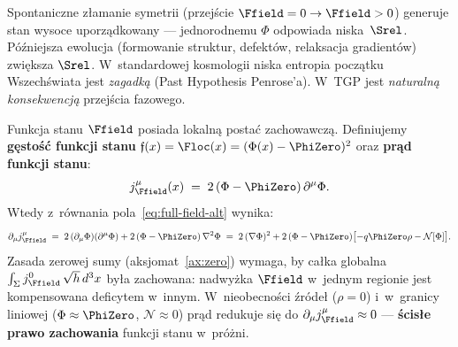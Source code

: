 \begin{remark}
Spontaniczne z\l{}amanie symetrii (przej\'scie
$\Ffield = 0 \to \Ffield > 0$) generuje stan wysoce
uporz\k{a}dkowany --- jednorodnemu $\Phi$ odpowiada
niska~$\Srel$. P\'o\'zniejsza ewolucja (formowanie struktur,
defekt\'ow, relaksacja gradient\'ow) zwi\k{e}ksza $\Srel$.
W~standardowej kosmologii niska entropia pocz\k{a}tku Wszech\'swiata
jest \emph{zagadk\k{a}} (Past Hypothesis Penrose'a).
W~TGP jest \emph{naturaln\k{a} konsekwencj\k{a}} przej\'scia
fazowego.
\end{remark}

\begin{proposition}\label{prop:F-current}
Funkcja stanu $\Ffield$ posiada lokaln\k{a} posta\'c zachowawcz\k{a}.
Definiujemy \textbf{g\k{e}sto\'s\'c funkcji stanu}
$\mathfrak{f}(x) = \Floc(x) = (\Phi(x) - \PhiZero)^2$ oraz
\textbf{pr\k{a}d funkcji stanu}:
\begin{equation}\label{eq:F-current}
    j_{\Ffield}^\mu(x) \;=\; 2\,(\Phi - \PhiZero)\,\partial^\mu\Phi.
\end{equation}
Wtedy z~r\'ownania pola~\eqref{eq:full-field-alt} wynika:
\begin{equation}\label{eq:F-conservation}
    \partial_\mu j_{\Ffield}^\mu
    \;=\; 2\,(\partial_\mu\Phi)(\partial^\mu\Phi)
    + 2\,(\Phi - \PhiZero)\,\nabla^2\Phi
    \;=\; 2\,(\nabla\Phi)^2
    + 2\,(\Phi - \PhiZero)\bigl[-q\PhiZero\rho
    - \mathcal{N}[\Phi]\bigr].
\end{equation}
Zasada zerowej sumy (aksjomat~\ref{ax:zero}) wymaga, by
ca\l{}ka globalna $\int_\Sigma j_{\Ffield}^0\,\sqrt{h}\,d^3x$
by\l{}a zachowana: nadwy\.zka $\Ffield$ w~jednym regionie jest
kompensowana deficytem w~innym.
W~nieobecno\'sci \'zr\'ode\l{} ($\rho = 0$) i~w~granicy liniowej
($\Phi \approx \PhiZero$, $\mathcal{N} \approx 0$) pr\k{a}d
redukuje si\k{e} do $\partial_\mu j_{\Ffield}^\mu \approx 0$
--- \textbf{\'scis\l{}e prawo zachowania} funkcji stanu
w~pr\'o\.zni.
\end{proposition}

